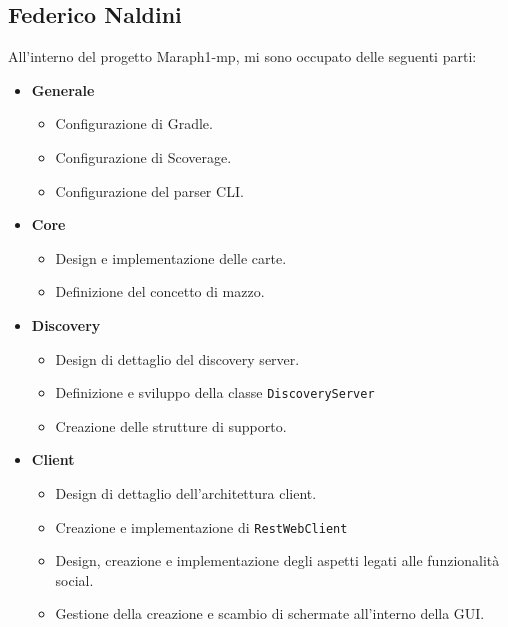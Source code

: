        \subsection{Federico Naldini}\label{subsec:naldini}
All'interno del progetto Maraph1-mp, mi sono occupato delle seguenti parti:
\begin{itemize}
	\item{\textbf{Generale}}
	 \begin{itemize}
	 	\item Configurazione di Gradle.
	 	\item Configurazione di Scoverage.
	 	\item Configurazione del parser CLI.
	 \end{itemize}

\item{\textbf{Core}}
\begin{itemize}
	\item Design e implementazione delle carte.
	\item Definizione del concetto di mazzo.
\end{itemize}

\item{\textbf{Discovery}}
\begin{itemize}
	\item Design di dettaglio del discovery server.
	\item Definizione e sviluppo della classe \texttt{DiscoveryServer}
	\item Creazione delle strutture di supporto.
\end{itemize}

\item{\textbf{Client}}
\begin{itemize}
	\item Design di dettaglio dell'architettura client.
	\item Creazione e implementazione di \texttt{RestWebClient}
	\item Design, creazione e implementazione degli aspetti legati alle funzionalità social.
	\item Gestione della creazione e scambio di schermate all'interno della GUI.
\end{itemize}

\end{itemize}

